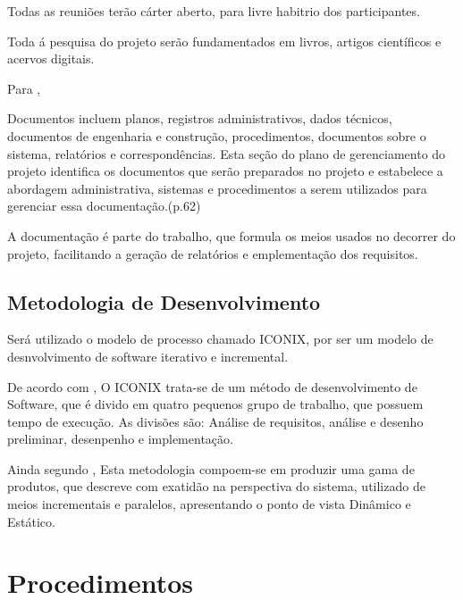 \par Todas as reuniões terão cárter aberto, para livre habitrio dos
participantes.


\par Toda á pesquisa do projeto serão fundamentados em livros, artigos
científicos e acervos digitais.

\par Para ,
\begin{citacao}
	Documentos incluem planos, registros administrativos, dados técnicos, documentos
	de engenharia e construção, procedimentos, documentos sobre o sistema,
	relatórios e correspondências. Esta seção do plano de gerenciamento do
	projeto identifica os documentos que serão preparados no projeto e estabelece
	a abordagem administrativa, sistemas e procedimentos a serem utilizados para
	gerenciar essa documentação.(p.62)
\end{citacao}

\par A documentação é parte do trabalho, que formula os meios usados no decorrer do projeto,
facilitando a geração de relatórios e emplementação dos requisitos.


\subsection{Metodologia de Desenvolvimento}

\par Será utilizado o modelo de processo chamado ICONIX, por ser um modelo de desnvolvimento
de software iterativo e incremental.

\par De acordo com , O ICONIX trata-se de um método de desenvolvimento
de Software, que é divido em quatro pequenos grupo de trabalho, que possuem tempo
de execução. As divisões são: Análise de requisitos, análise e desenho preliminar, desenpenho
e implementação.

\par Ainda segundo , Esta metodologia compoem-se em
produzir uma gama de produtos, que descreve com exatidão na perspectiva do sistema, utilizado de meios
incrementais e paralelos, apresentando o ponto de vista Dinâmico e Estático.


\section{Procedimentos}

